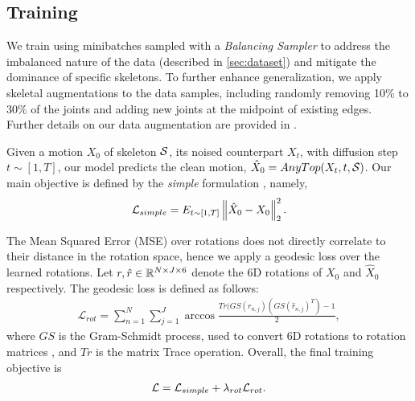 \subsection{Training}\label{subsec:training}
We train \algoname using minibatches sampled with a \emph{Balancing Sampler} to address the imbalanced nature of the data (described in \cref{sec:dataset}) and mitigate the dominance of specific skeletons. To further enhance generalization, we apply skeletal augmentations to the data samples, including randomly removing 10\% to 30\% of the joints and adding new joints at the midpoint of existing edges. Further details on our data augmentation are provided in .

Given a motion $X_0$ of skeleton $\mathcal{S}$, its noised counterpart $X_t$, with diffusion step $t\sim [1,T]$, our model predicts the clean  motion,  $\hat{X}_{0} = AnyTop(X_{t}, t, \mathcal{S}) $.
Our main objective is defined by the \emph{simple} formulation \cite{ho2020denoising}, namely,
\begin{align}
   \mathcal{L}_{simple} =  E_{t \sim [1,T]}\left\lVert \hat{X}_{0} - X_{0}\right\rVert^2_2.
\end{align}

The Mean Squared Error (MSE) over rotations does not directly correlate to their distance in the rotation space, hence we apply a geodesic loss \cite{Huang_2017_CVPR, tripathi2024humos} over the learned rotations. Let $r, \hat{r} \in \mathbb{R}^{N\times J \times 6}$ denote the 6D rotations of $X_0$ and $\hat{X}_0$ respectively. The geodesic loss is defined as follows: 
\begin{align}
    \mathcal{L}_{rot} = \sum_{n=1}^N {\sum_{j=1}^J {\arccos\frac{Tr(GS(r_{n,j})(GS(\hat{r}_{n,j})^T) - 1 }{2}}},
\end{align}
where $GS$ is the Gram-Schmidt process, used to convert 6D rotations to rotation matrices \cite{zhou2019continuity}, and $Tr$ is the matrix Trace operation. 
Overall, the final training objective is 
\begin{align}
    \mathcal{L} = \mathcal{L}_{simple} + \lambda_{rot}\mathcal{L}_{rot}.
\end{align}





